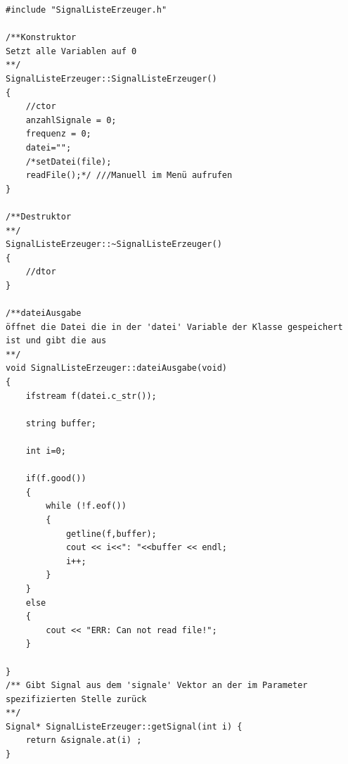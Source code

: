 \documentclass[a4paper,10pt,twoside]{report}
\begin{document}
\begin{lstlisting}
#include "SignalListeErzeuger.h"

/**Konstruktor
Setzt alle Variablen auf 0
**/
SignalListeErzeuger::SignalListeErzeuger()
{
    //ctor
    anzahlSignale = 0;
    frequenz = 0;
    datei="";
    /*setDatei(file);
    readFile();*/ ///Manuell im Menü aufrufen
}

/**Destruktor
**/
SignalListeErzeuger::~SignalListeErzeuger()
{
    //dtor
}

/**dateiAusgabe
öffnet die Datei die in der 'datei' Variable der Klasse gespeichert ist und gibt die aus
**/
void SignalListeErzeuger::dateiAusgabe(void)
{
    ifstream f(datei.c_str());

    string buffer;

    int i=0;

    if(f.good())
    {
        while (!f.eof())
        {
            getline(f,buffer);
            cout << i<<": "<<buffer << endl;
            i++;
        }
    }
    else
    {
        cout << "ERR: Can not read file!";
    }

}
/** Gibt Signal aus dem 'signale' Vektor an der im Parameter spezifizierten Stelle zurück
**/
Signal* SignalListeErzeuger::getSignal(int i) {
    return &signale.at(i) ;
}


\end{lstlisting}
\end{document}
